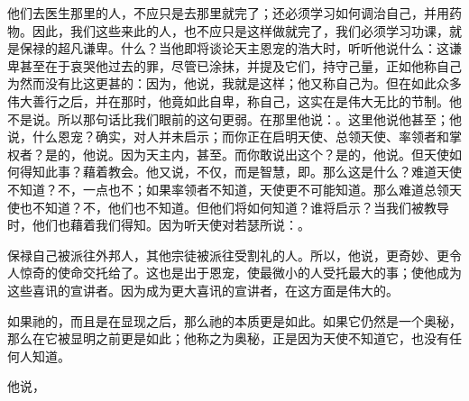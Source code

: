 他们去医生那里的人，不应只是去那里就完了；还必须学习如何调治自己，并用药物。因此，我们这些来此的人，也不应只是这样做就完了，我们必须学习功课，就是保禄的超凡谦卑。什么？当他即将谈论天主恩宠的浩大时，听听他说什么：这谦卑甚至在于哀哭他过去的罪，尽管已涂抹，并提及它们，持守己量，正如他称自己为然而没有比这更甚的：因为，他说，我就是这样；他又称自己为。但在如此众多伟大善行之后，并在那时，他竟如此自卑，称自己，这实在是伟大无比的节制。他不是说。所以那句话比我们眼前的这句更弱。在那里他说：。这里他说他甚至；他说，什么恩宠？确实，对人并未启示；而你正在启明天使、总领天使、率领者和掌权者？是的，他说。因为天主内，甚至。而你敢说出这个？是的，他说。但天使如何得知此事？藉着教会。他又说，不仅，而是智慧，即。那么这是什么？难道天使不知道？不，一点也不；如果率领者不知道，天使更不可能知道。那么难道总领天使也不知道？不，他们也不知道。但他们将如何知道？谁将启示？当我们被教导时，他们也藉着我们得知。因为听天使对若瑟所说：。\par

保禄自己被派往外邦人，其他宗徒被派往受割礼的人。所以，他说，更奇妙、更令人惊奇的使命交托给了。这也是出于恩宠，使最微小的人受托最大的事；使他成为这些喜讯的宣讲者。因为成为更大喜讯的宣讲者，在这方面是伟大的。\par

\par

如果祂的，而且是在显现之后，那么祂的本质更是如此。如果它仍然是一个奥秘，那么在它被显明之前更是如此；他称之为奥秘，正是因为天使不知道它，也没有任何人知道。\par

他说，\par

